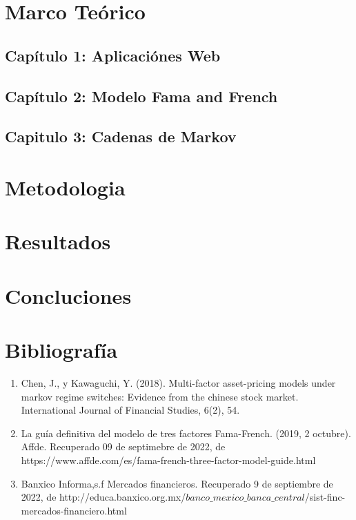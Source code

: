 \documentclass[12pt,a4paper]{article}
\begin{document}
	\section{Marco Teórico}
	\subsection{Capítulo 1: Aplicaciónes Web}
	\hfill\break
	\subsection{Capítulo 2: Modelo Fama and French}
	\hfill\break
	\subsection{Capitulo 3: Cadenas de Markov}	
	\hfill\break
	\section{Metodologia}
	\hfill\break
	\section{Resultados}
	\hfill\break
	\section{Concluciones}
	\hfill\break
	\section{Bibliografía}
	\hfill\break
	\begin{enumerate}
	    \item Chen, J., y Kawaguchi, Y. (2018). Multi-factor asset-pricing models under markov regime switches: Evidence from the	chinese stock market. International Journal of Financial Studies, 6(2), 54.
	    \item  La guía definitiva del modelo de tres factores Fama-French. (2019, 2 octubre). Affde. Recuperado  09 de septimebre de 2022, de https://www.affde.com/es/fama-french-three-factor-model-guide.html
	    \item Banxico Informa,s.f Mercados financieros. Recuperado 9 de septiembre de 2022, de http://educa.banxico.org.mx/$banco\_mexico\_banca\_central$/sist-finc-mercados-financiero.html
	\end{enumerate}				
\end{document}
